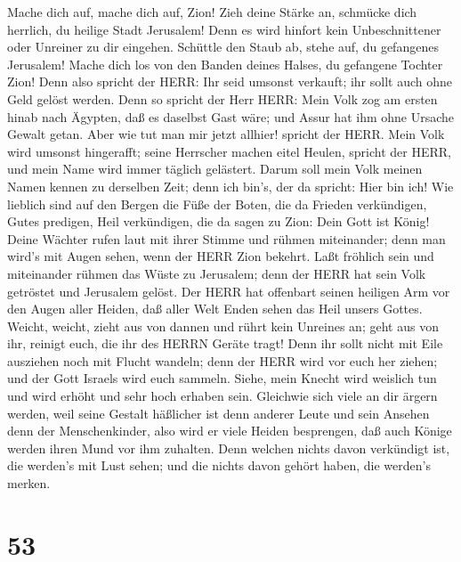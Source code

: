  Mache dich auf, mache dich auf, Zion! Zieh deine Stärke an,
schmücke dich herrlich, du heilige Stadt Jerusalem! Denn es wird hinfort
kein Unbeschnittener oder Unreiner zu dir eingehen. 
Schüttle den Staub ab, stehe auf, du gefangenes Jerusalem! Mache dich
los von den Banden deines Halses, du gefangene Tochter Zion!
 Denn also spricht der HERR: Ihr seid umsonst verkauft; ihr
sollt auch ohne Geld gelöst werden.  Denn so spricht der
Herr HERR: Mein Volk zog am ersten hinab nach Ägypten, daß es daselbst
Gast wäre; und Assur hat ihm ohne Ursache Gewalt getan. 
Aber wie tut man mir jetzt allhier! spricht der HERR. Mein Volk wird
umsonst hingerafft; seine Herrscher machen eitel Heulen, spricht der
HERR, und mein Name wird immer täglich gelästert.  Darum
soll mein Volk meinen Namen kennen zu derselben Zeit; denn ich bin's,
der da spricht: Hier bin ich!  Wie lieblich sind auf den
Bergen die Füße der Boten, die da Frieden verkündigen, Gutes predigen,
Heil verkündigen, die da sagen zu Zion: Dein Gott ist König!
 Deine Wächter rufen laut mit ihrer Stimme und rühmen
miteinander; denn man wird's mit Augen sehen, wenn der HERR Zion
bekehrt.  Laßt fröhlich sein und miteinander rühmen das
Wüste zu Jerusalem; denn der HERR hat sein Volk getröstet und Jerusalem
gelöst.  Der HERR hat offenbart seinen heiligen Arm vor den
Augen aller Heiden, daß aller Welt Enden sehen das Heil unsers Gottes.
 Weicht, weicht, zieht aus von dannen und rührt kein
Unreines an; geht aus von ihr, reinigt euch, die ihr des HERRN Geräte
tragt!  Denn ihr sollt nicht mit Eile ausziehen noch mit
Flucht wandeln; denn der HERR wird vor euch her ziehen; und der Gott
Israels wird euch sammeln.  Siehe, mein Knecht wird
weislich tun und wird erhöht und sehr hoch erhaben sein. 
Gleichwie sich viele an dir ärgern werden, weil seine Gestalt häßlicher
ist denn anderer Leute und sein Ansehen denn der Menschenkinder,
 also wird er viele Heiden besprengen, daß auch Könige
werden ihren Mund vor ihm zuhalten. Denn welchen nichts davon verkündigt
ist, die werden's mit Lust sehen; und die nichts davon gehört haben, die
werden's merken.

\hypertarget{section-52}{%
\section{53}\label{section-52}}

